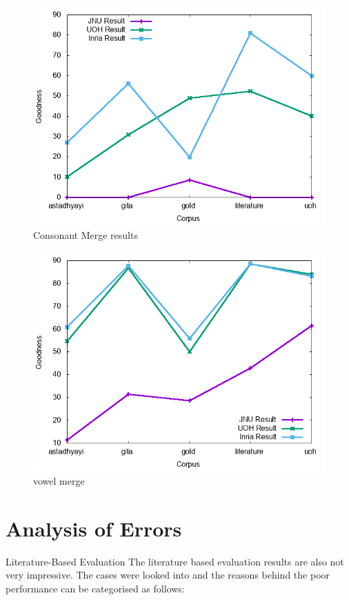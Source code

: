 \documentclass[11pt]{article}
\begin{document}
\begin{figure}[h]
	\center
	\includegraphics[scale=0.34]{images/consonantmerge.png}
	\caption{\label{screen}Consonant Merge results}
\end{figure}

\begin{figure}[h]
	\center
	\includegraphics[scale=0.34]{images/vowelmerge.png}
	\caption{\label{screen}vowel merge}
\end{figure}




\section{Analysis of Errors}
 Literature-Based Evaluation
The literature based evaluation results are also not very impressive. The cases were looked into and the reasons behind the poor performance can be categorised as follows:
\end{document}
